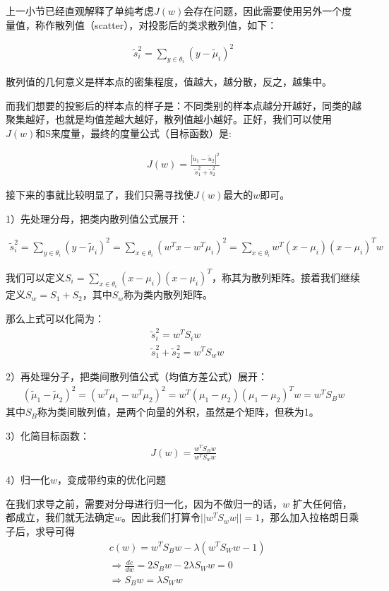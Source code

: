 上一小节已经直观解释了单纯考虑$J(w)$会存在问题，因此需要使用另外一个度量值，称作散列值（scatter），对投影后的类求散列值，如下：

\begin{eqnarray}
\tilde s_i^2 = \sum_{y \in \theta_i}(y - \tilde \mu_i)^2
\end{eqnarray}

散列值的几何意义是样本点的密集程度，值越大，越分散，反之，越集中。

而我们想要的投影后的样本点的样子是：不同类别的样本点越分开越好，同类的越聚集越好，也就是均值差越大越好，散列值越小越好。正好，我们可以使用$J(w)$和S来度量，最终的度量公式（目标函数）是:

\begin{eqnarray}
J(w) = \frac{|\tilde u_1 - \tilde u_2|^2}{\tilde s_1^2 + \tilde s_2^2}
\end{eqnarray}

接下来的事就比较明显了，我们只需寻找使$J(w)$最大的$w$即可。

1）先处理分母，把类内散列值公式展开：

\begin{eqnarray}
\tilde s_i^2 = \sum_{y \in \theta_i}(y - \tilde \mu_i)^2 = \sum_{x \in \theta_i}(w^T x - w^T \mu_i)^2 = \sum_{x \in \theta_i} w^T(x - \mu_i)(x - \mu_i)^T w
\end{eqnarray}

我们可以定义$S_i = \sum_{x \in \theta_i}(x - \mu_i)(x - \mu_i)^T$，称其为散列矩阵。接着我们继续定义$S_w = S_1 + S_2$，其中$S_w$称为类内散列矩阵。

那么上式可以化简为：
\begin{align}
& \tilde s_i^2 = w^T S_i w \\
& \tilde s_1^2 + \tilde s_2^2 =  w^T S_w w
\end{align}

2）再处理分子，把类间散列值公式（均值方差公式）展开：
\begin{eqnarray}
(\tilde \mu_1 - \tilde \mu_2)^2 = (w^T\mu_1 - w^T\mu_2)^2 = w^T(\mu_1 - \mu_2)(\mu_1 - \mu_2)^T w = w^TS_Bw
\end{eqnarray}
其中$S_B$称为类间散列值，是两个向量的外积，虽然是个矩阵，但秩为1。

3）化简目标函数：
\begin{eqnarray}
J(w) = \frac{w^TS_B w}{w^TS_w w}
\end{eqnarray}

4）归一化$w$，变成带约束的优化问题

在我们求导之前，需要对分母进行归一化，因为不做归一的话，$w$ 扩大任何倍，都成立，我们就无法确定$w$。因此我们打算令$||w^TS_ww|| = 1$，那么加入拉格朗日乘子后，求导可得
\begin{align}
& c(w) = w^TS_Bw - \lambda(w^T S_Ww - 1)\\
& \Rightarrow \frac{dc}{dw} = 2S_Bw - 2\lambda S_W w = 0 \\
& \Rightarrow S_Bw = \lambda S_Ww
\end{align}

